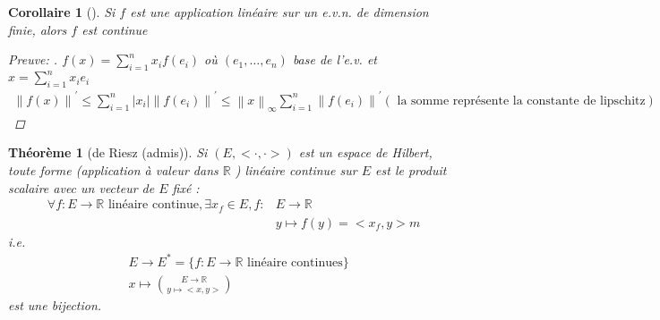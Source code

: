 \documentclass{article}
\theoremstyle{plain}%
\newtheorem{thm}{Théorème}[section]
\newtheorem*{cor}{Corollaire}
\theoremstyle{definition}
\theoremstyle{remark}
\begin{document}
\begin{cor}[]
	Si $ f $ est une application linéaire sur un e.v.n. de dimension finie, alors $ f $ est continue

	\begin{proof}[Preuve: ]
		$ f(x) = \sum_{i=1}^{n}x_i f(e_i) $ où $ (e_1, \dots, e_n) $ base de l'e.v. et $ x = \sum_{i=1}^{n}x_i e_i $ 
		\begin{align*}
			\left\| f(x) \right\| ^\prime \leq \sum_{i=1}^{n}\left| x_i \right| \left\| f(e_i) \right\| ^\prime  \leq \left\| x \right\| _\infty \sum_{i=1}^{n}\left\| f(e_i) \right\| ^\prime (\text{ la somme représente la constante de lipschitz})
		\end{align*}
	\end{proof}
\end{cor}

\begin{thm}[de Riesz (admis)]
	Si $ (E, <\cdot , \cdot >) $ est un espace de Hilbert, toute forme (application à valeur dans $ \mathbb{R} $ ) linéaire continue sur $ E $ est le produit scalaire avec un vecteur de $ E $ fixé : 
	\begin{align*}
		\forall f : E \to \mathbb{R} \text{ linéaire continue}, \exists x_f \in E, f: &E \to \mathbb{R} \\
		& y \mapsto f(y) = <x_f, y>m
	\end{align*}
	i.e. \begin{align*}
		&E \to E^* = \{f:E \to \mathbb{R} \text{ linéaire continues}\}\\
		&x \mapsto \binom{E \to \mathbb{R}}{y \mapsto <x,y>}  
	\end{align*}
	est une bijection.
\end{thm}
\end{document}
